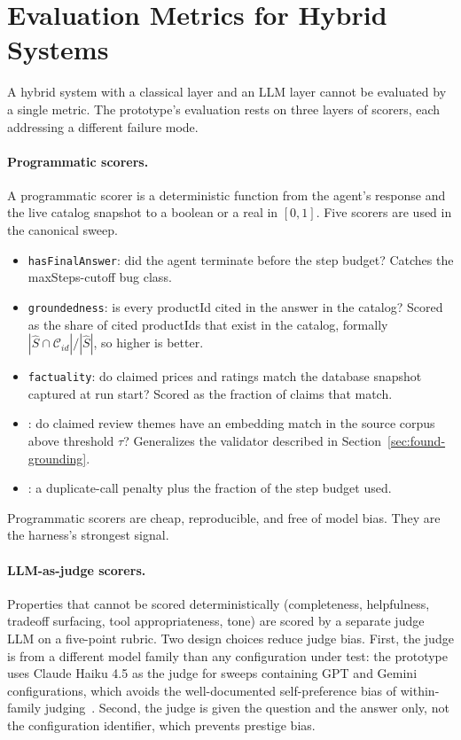 \section{Evaluation Metrics for Hybrid Systems}
\label{sec:found-eval}

A hybrid system with a classical layer and an LLM layer cannot be
evaluated by a single metric. The prototype's evaluation rests on
three layers of scorers, each addressing a different failure
mode.

\paragraph{Programmatic scorers.} A programmatic scorer is a
deterministic function from the agent's response and the live
catalog snapshot to a boolean or a real in $[0, 1]$. Five scorers
are used in the canonical sweep.

\begin{itemize}
  \item \texttt{hasFinalAnswer}: did the agent terminate before the
    step budget? Catches the maxSteps-cutoff bug class.
  \item \texttt{groundedness}: is every productId cited in the
    answer in the catalog? Scored as the share of cited productIds
    that exist in the catalog, formally
    $|\hat{S} \cap \mathcal{C}_{id}| / |\hat{S}|$, so higher is
    better.
  \item \texttt{factuality}: do claimed prices and ratings match
    the database snapshot captured at run start? Scored as the
    fraction of claims that match.
  \item {}: do claimed review themes
    have an embedding match in the source corpus above
    threshold $\tau$? Generalizes the validator described in
    Section~\ref{sec:found-grounding}.
  \item {}: a duplicate-call penalty
    plus the fraction of the step budget used.
\end{itemize}

Programmatic scorers are cheap, reproducible, and free of model
bias. They are the harness's strongest signal.

\paragraph{LLM-as-judge scorers.} Properties that cannot be scored
deterministically (completeness, helpfulness, tradeoff surfacing,
tool appropriateness, tone) are scored by a separate judge LLM on
a five-point rubric. Two design choices reduce judge bias. First,
the judge is from a different model family than any configuration
under test: the prototype uses Claude Haiku 4.5 as the judge for
sweeps containing GPT and Gemini configurations, which avoids the
well-documented self-preference bias of within-family
judging~\cite{LLMJudgeSurvey2024}. Second, the judge is given the
question and the answer only, not the configuration identifier,
which prevents prestige bias.


